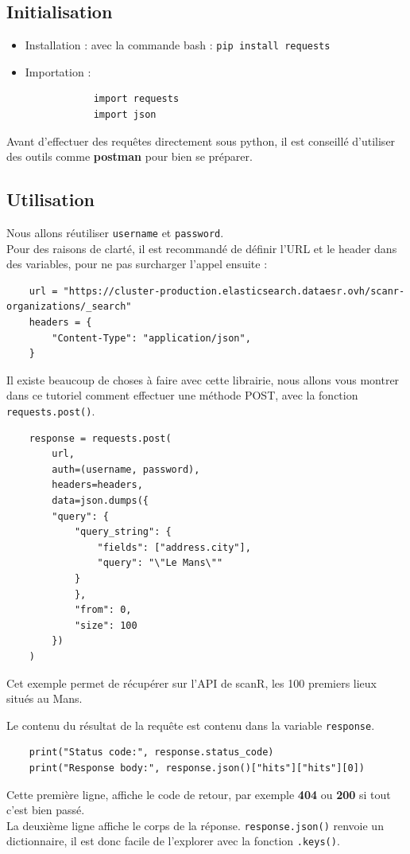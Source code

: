 \documentclass[12pt]{article}
\begin{document}
\subsection{Initialisation}
\begin{itemize}
    \item Installation : avec la commande bash : \texttt{pip install requests}
    \item Importation :
        \begin{verbatim}
            import requests
            import json
        \end{verbatim}
\end{itemize}
Avant d'effectuer des requêtes directement sous python, il est conseillé d'utiliser des outils comme \textbf{postman} pour bien se préparer.

\subsection{Utilisation}
Nous allons réutiliser \texttt{username} et \texttt{password}.
\\Pour des raisons de clarté, il est recommandé de définir l'URL et le header dans des variables, pour ne pas surcharger l'appel ensuite :
\begin{verbatim}
    url = "https://cluster-production.elasticsearch.dataesr.ovh/scanr-organizations/_search"
    headers = {
        "Content-Type": "application/json",
    }
\end{verbatim}

\par Il existe beaucoup de choses à faire avec cette librairie, nous allons vous montrer dans ce tutoriel comment effectuer une méthode POST, avec la fonction \texttt{requests.post()}.
\begin{verbatim}
    response = requests.post(
        url,
        auth=(username, password),
        headers=headers,
        data=json.dumps({
        "query": {
            "query_string": {
                "fields": ["address.city"],
                "query": "\"Le Mans\""
            }
            },
            "from": 0,
            "size": 100
        })
    )
\end{verbatim}
\par Cet exemple permet de récupérer sur l'API de scanR, les 100 premiers lieux situés au Mans.
\par Le contenu du résultat de la requête est contenu dans la variable \texttt{response}.
\begin{verbatim}
    print("Status code:", response.status_code)
    print("Response body:", response.json()["hits"]["hits"][0])
\end{verbatim}
Cette première ligne, affiche le code de retour, par exemple \textbf{404} ou \textbf{200} si tout c'est bien passé.
\\La deuxième ligne affiche le corps de la réponse. \texttt{response.json()} renvoie un dictionnaire, il est donc facile de l'explorer avec la fonction \texttt{.keys()}.
\end{document}
